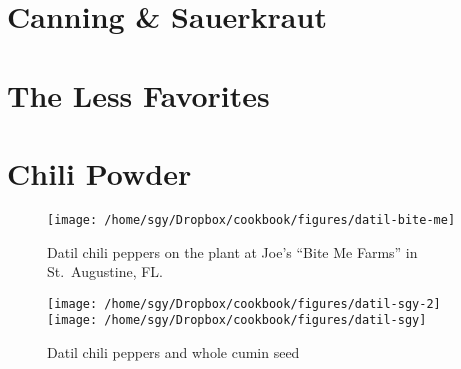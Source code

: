 \documentclass[12pt, final]{book}
\begin{document}
\chapter{Canning \& Sauerkraut}

\newpage

\newpage
\chapter{The Less Favorites}\label{chapter3}

\newpage

\newpage

\newpage

\newpage

\newpage

\newpage

\chapter{Chili Powder}








\begin{figure}
\begin{center}
\texttt{[image: /home/sgy/Dropbox/cookbook/figures/datil-bite-me]}
\end{center}
\caption*{Datil chili peppers on the plant at Joe's ``Bite Me Farms'' in St.\ Augustine, FL.}
\end{figure}
\begin{figure}
\begin{center}
\texttt{[image: /home/sgy/Dropbox/cookbook/figures/datil-sgy-2]}
\texttt{[image: /home/sgy/Dropbox/cookbook/figures/datil-sgy]}
\end{center}
\caption*{Datil chili peppers and whole cumin seed}
\end{figure}
\end{document}
